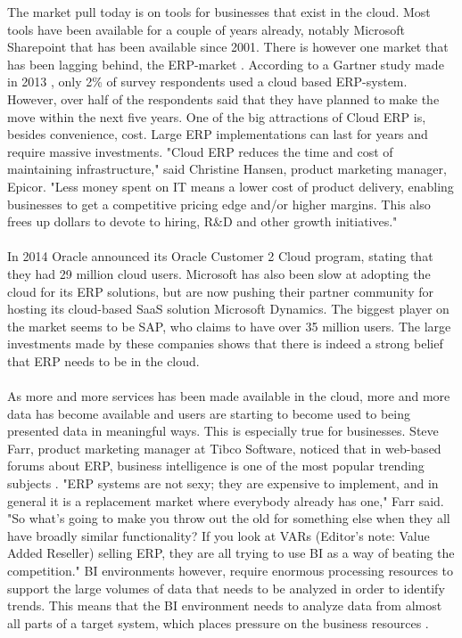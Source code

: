 \documentclass{cslthse-msc}
\begin{document}
The market pull today is on tools for businesses that exist in the cloud. Most tools have been available for a couple of years already, notably Microsoft Sharepoint that has been available since 2001. There is however one market that has been lagging behind, the ERP-market \cite{wilson}. According to a Gartner study made in 2013 \cite{Rayner13}, only 2\% of survey respondents used a cloud based ERP-system. However, over half of the respondents said that they have planned to make the move within the next five years. One of the big attractions of Cloud ERP is, besides convenience, cost. Large ERP implementations can last for years and require massive investments. "Cloud ERP reduces the time and cost of maintaining infrastructure," said Christine Hansen, product marketing manager, Epicor. "Less money spent on IT means a lower cost of product delivery, enabling businesses to get a competitive pricing edge and/or higher margins. This also frees up dollars to devote to hiring, R\&D and other growth initiatives." \cite{Robb14} \\\\
In 2014 Oracle announced its Oracle Customer 2 Cloud program, stating that they had 29 million cloud users. Microsoft has also been slow at adopting the cloud for its ERP solutions, but are now pushing their partner community for hosting its cloud-based SaaS solution Microsoft Dynamics.
The biggest player on the market seems to be SAP, who claims to have over 35 million users. The large investments made by these companies shows that there is indeed a strong belief that ERP needs to be in the cloud.\\\\
As more and more services has been made available in the cloud, more and more data has become available and users are starting to become used to being presented data in meaningful ways. This is especially true for businesses. Steve Farr, product marketing manager at Tibco Software, noticed that in web-based forums about ERP, business intelligence is one of the most popular trending subjects \cite{RobbOkt14}. "ERP systems are not sexy; they are expensive to implement, and in general it is a replacement market where everybody already has one," Farr said. "So what's going to make you throw out the old for something else when they all have broadly similar functionality? If you look at VARs (Editor's note: Value Added Reseller) selling ERP, they are all trying to use BI as a way of beating the competition." BI environments however, require enormous processing resources to support the large volumes of data that needs to be analyzed in order to identify trends. This means that the BI environment needs to analyze data from almost all parts of a target system, which places pressure on the business resources \cite{Thompson10}.\\\\
\end{document}
